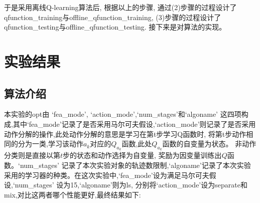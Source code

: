 \documentclass[12pt,a4paper]{ctexart}
\theoremstyle{definition}
\begin{document}
于是采用离线Q-learning算法后, 
根据以上的步骤, 
通过(2)步骤的过程设计了
\\ qfunction\_training与offline\_qfunction\_training,
(3)步骤的过程设计了\\ qfunction\_testing与offline\_qfunction\_testing.
接下来是对算法的实现。

\section{实验结果}
\subsection{算法介绍}
本实验的opt由 ‘fea\_mode’, ‘action\_mode',‘num\_stages'和‘algoname'
这四项构成,其中‘fea\_mode'记录了是否采用马尔可夫假设,‘action\_mode'则记录了是否采用动作分解的操作,此处动作分解的意思是学习在第t步学习Q函数时,
将第t步动作相同的分为一类,学习该动作$a_k$对应的$Q_{a_k}$函数,此处$Q_{a_k}$函数的自变量为状态。
非动作分类则是直接以第$t$步的状态和动作选择为自变量,
奖励为因变量训练出$Q$函数。‘num\_stages’
记录了本次实验对象的轨迹数限制,‘algoname’记录了本次实验采用的学习器的种类。在这次实验中,‘fea\_mode’设为满足马尔可夫假设,‘num\_stages'
设为15,‘algoname'则为ls,
分别将‘action\_mode'设为separate和mix,对比这两者哪个性能更好,最终结果如下:
\end{document}
